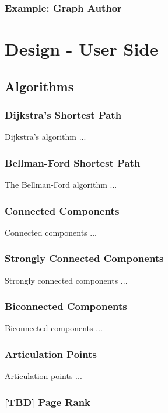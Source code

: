 \documentclass[10pt,onecolumn]{article}
\begin{document}
\subsubsection{Example: Graph Author}

\section{Design - User Side}
\subsection{Algorithms}

\subsubsection{Dijkstra's Shortest Path}
Dijkstra's algorithm \cite{REF_} ...

\subsubsection{Bellman-Ford Shortest Path}
The Bellman-Ford algorithm \cite{REF_} ...

\subsubsection{Connected Components}
Connected components \cite{REF_} ...

\subsubsection{Strongly Connected Components}
Strongly connected components \cite{REF_} ...

\subsubsection{Biconnected Components}
Biconnected components \cite{REF_} ...

\subsubsection{Articulation Points}
Articulation points \cite{REF_} ...

\subsubsection{[TBD] Page Rank}
\end{document}
